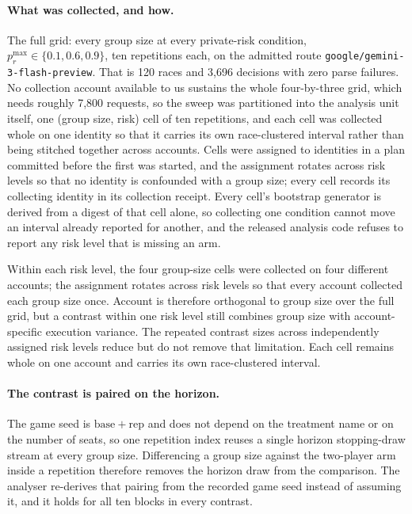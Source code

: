 \documentclass[sigconf,anonymous]{aamas}
\begin{document}
\paragraph{What was collected, and how.} The full grid: every group size at
every private-risk condition, $p_r^{\max}\in\{0.1,0.6,0.9\}$, ten repetitions
each, on the admitted route
\texttt{google/\discretionary{}{}{}gemini-\discretionary{}{}{}3-\discretionary{}{}{}flash-\discretionary{}{}{}preview}. That is 120 races and 3{,}696
decisions
with zero parse failures. No collection account available to us sustains the
whole four-by-three grid, which needs roughly 7{,}800 requests, so the sweep was
partitioned into the analysis unit itself, one (group size, risk) cell of ten
repetitions, and each cell was collected whole on one identity so that it
carries its own race-clustered interval rather than being stitched together
across accounts. Cells were assigned to identities in a plan committed before
the first was started, and the assignment rotates across risk levels so that no
identity is confounded with a group size; every cell records its collecting
identity in its collection receipt. Every cell's bootstrap generator is derived
from a digest of that cell alone, so collecting one condition cannot move an
interval already reported for another, and the released analysis code refuses
to report any risk level that is missing an arm.

Within each risk level, the four group-size cells were collected on four
different accounts; the assignment rotates across risk levels so that every
account collected each group size once. Account is therefore orthogonal to
group size over the full grid, but a contrast within one risk level still
combines group size with account-specific execution variance. The repeated
contrast sizes across independently assigned risk levels reduce but do not
remove that limitation. Each cell remains whole on one account and carries its
own race-clustered interval.

\paragraph{The contrast is paired on the horizon.} The game seed is
$\mathrm{base} + \mathrm{rep}$ and does not depend on the treatment name or on
the number of seats, so one repetition index reuses a single horizon
stopping-draw stream at every group size. Differencing a group size against the
two-player arm inside a repetition therefore removes the horizon draw from the
comparison. The analyser re-derives that pairing from the recorded game seed
instead of assuming it, and it holds for all ten blocks in every contrast.
\end{document}
